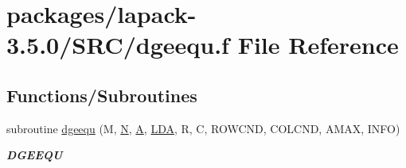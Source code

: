 \hypertarget{dgeequ_8f}{}\section{packages/lapack-\/3.5.0/\+S\+R\+C/dgeequ.f File Reference}
\label{dgeequ_8f}
\subsection*{Functions/\+Subroutines}
\begin{DoxyCompactItemize}
\item 
subroutine \hyperlink{group__doubleGEcomputational_ga56565ae06016954202aee24cdfc38257}{dgeequ} (M, \hyperlink{polmisc_8c_a0240ac851181b84ac374872dc5434ee4}{N}, \hyperlink{classA}{A}, \hyperlink{example__user_8c_ae946da542ce0db94dced19b2ecefd1aa}{L\+D\+A}, R, C, R\+O\+W\+C\+N\+D, C\+O\+L\+C\+N\+D, A\+M\+A\+X, I\+N\+F\+O)
\begin{DoxyCompactList}\small\item\em {\bfseries D\+G\+E\+E\+Q\+U} \end{DoxyCompactList}\end{DoxyCompactItemize}
